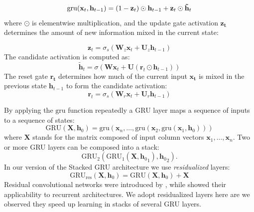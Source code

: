 \begin{equation}
  \mathrm{gru}(\mathbf{x}_t, \mathbf{h}_{t-1}) = (1 - \mathbf{z}_t)\odot \mathbf{h}_{t-1} + \mathbf{z}_t \odot \mathbf{\tilde{h}}_t
\vspace{-.1cm}
\end{equation}
%
where $\odot$ is elementwise multiplication, and the update gate
activation $\mathbf{z_{t}}$ determines the amount of new information
mixed in the current state:
%

\begin{equation}
\label{eq:gru-update}
   \mathbf{z}_t = \sigma_s(\mathbf{W}_z \mathbf{x}_t + \mathbf{U}_z \mathbf{h}_{t-1})
\end{equation}
%
The candidate activation is computed as:
%
\begin{equation}
\label{eq:gru-cand}
   \mathbf{\tilde{h}}_t = \sigma(\mathbf{W} \mathbf{x}_t + \mathbf{U}(\mathbf{r}_t \odot \mathbf{h}_{t-1}))
\end{equation}
%
The reset gate $\mathbf{r_{t}}$ determines how much of the current
input $\mathbf{x_{t}}$ is mixed in the previous state
$\mathbf{h}_{t-1}$ to form the candidate activation:
%
\begin{equation}
\label{eq:gru-reset}
   \mathbf{r}_t = \sigma_s(\mathbf{W}_r \mathbf{x}_t + \mathbf{U}_r \mathbf{h}_{t-1})
\end{equation}

By applying the $\mathrm{gru}$ function repeatedly a GRU layer maps a
sequence of inputs to a sequence of states:
\begin{equation}
  \mathrm{GRU}(\mathbf{X}, \mathbf{h}_0) = \mathrm{gru}(\mathbf{x}_n, \dots, \mathrm{gru}(\mathbf{x}_2, \mathrm{gru}(\mathbf{x}_1, \mathbf{h}_0)))
\end{equation}
where $\mathbf{X}$ stands for the matrix composed of input column vectors
$\mathbf{x}_1, \ldots, \mathbf{x}_n$. Two or more GRU layers can be composed into a stack: 
\begin{equation}
\mathrm{GRU}_2(\mathrm{GRU}_1(\mathbf{X}, {\mathbf{h}_{0}}_{1}), {\mathbf{h}_{0}}_{2}).
\end{equation}
In our version of the Stacked GRU architecture we use {\it residualized} layers:
\begin{equation}
\mathrm{GRU_{res}}(\mathbf{X}, \mathbf{h}_0) = \mathrm{GRU}(\mathbf{X}, \mathbf{h}_0) + \mathbf{X}
\end{equation}
Residual convolutional networks were introduced by
, while  showed their
applicability to recurrent architectures. We adopt residualized layers
here are we observed they speed up learning in stacks of several
GRU layers.

